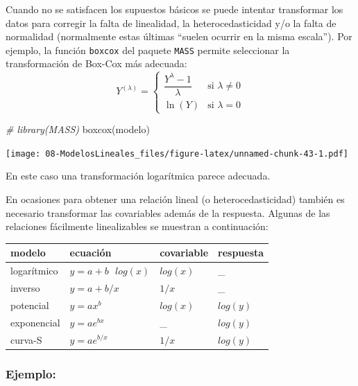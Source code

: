 \documentclass[
]{book}
\newenvironment{Shaded}{\begin{snugshade}}{\end{snugshade}}
\newcommand{\CommentTok}[1]{\textcolor[rgb]{0.56,0.35,0.01}{\textit{#1}}}
\newcommand{\FunctionTok}[1]{\textcolor[rgb]{0.00,0.00,0.00}{#1}}
\newcommand{\NormalTok}[1]{#1}
\theoremstyle{break}
\theoremstyle{nonumberplain}
\begin{document}
Cuando no se satisfacen los supuestos básicos se puede intentar
transformar los datos para corregir la falta de
linealidad, la heterocedasticidad y/o la falta de normalidad
(normalmente estas últimas ``suelen ocurrir en la misma escala'').
Por ejemplo, la función \texttt{boxcox} del paquete \texttt{MASS} permite seleccionar la transformación de Box-Cox
más adecuada:
\[Y^{(\lambda)} =
\begin{cases}
\dfrac{Y^\lambda - 1}{\lambda} & \text{si } \lambda \neq 0 \\
\ln{(Y)} & \text{si } \lambda = 0
\end{cases}\]

\begin{Shaded}
\begin{Highlighting}[]
\CommentTok{\# library(MASS)}
\FunctionTok{boxcox}\NormalTok{(modelo)}
\end{Highlighting}
\end{Shaded}

\texttt{[image: 08-ModelosLineales\_files/figure-latex/unnamed-chunk-43-1.pdf]}

En este caso una transformación logarítmica parece adecuada.

En ocasiones para obtener una relación lineal (o heterocedasticidad) también es
necesario transformar las covariables además de la respuesta. Algunas de
las relaciones fácilmente linealizables se muestran a continuación:

\begin{longtable}[]{@{}llll@{}}
\toprule
modelo & ecuación & covariable & respuesta \\
\midrule
\endhead
logarítmico & \(y = a + b\text{ }log(x)\) & \(log(x)\) & \_ \\
inverso & \(y = a + b/x\) & \(1/x\) & \_ \\
potencial & \(y = ax^b\) & \(log(x)\) & \(log(y)\) \\
exponencial & \(y = ae^{bx}\) & \_ & \(log(y)\) \\
curva-S & \(y = ae^{b/x}\) & \(1/x\) & \(log(y)\) \\
\bottomrule
\end{longtable}

\hypertarget{ejemplo-1}{%
\subsubsection{Ejemplo:}\label{ejemplo-1}}
\end{document}
